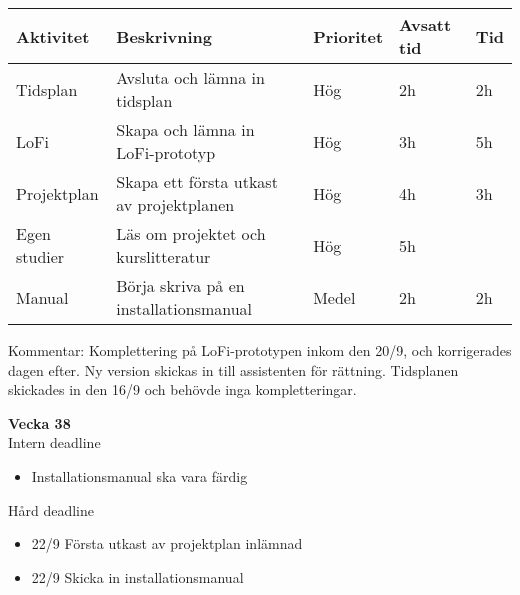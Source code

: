 \documentclass{mall}
\begin{document}
\begin{table}[h]
\begin{tabularx}{\textwidth}{|l|X|l|l|l|}
\hline

Aktivitet    & Beskrivning                              & Prioritet  & Avsatt tid & Tid \\ \hline
Tidsplan     & Avsluta och lämna in tidsplan            & Hög   & 2h         & 2h     \\ \hline
LoFi         & Skapa och lämna in LoFi-prototyp         & Hög   & 3h         & 5h     \\ \hline
Projektplan  & Skapa ett första utkast av projektplanen & Hög   & 4h         & 3h    \\ \hline
Egen studier & Läs om projektet och kurslitteratur      & Hög   & 5h         &     \\ \hline
Manual       & Börja skriva på en installationsmanual   & Medel & 2h         & 2h    \\ \hline

\end{tabularx}
\end{table}

Kommentar: Komplettering på LoFi-prototypen inkom den 20/9, och korrigerades dagen efter. Ny version skickas in till assistenten för rättning.
Tidsplanen skickades in den 16/9 och behövde inga kompletteringar.

\pagebreak

\hphantom{$\bullet$} \textbf{Vecka 38}\\

Intern deadline
\begin{itemize}
\color{blue}
    \item Installationsmanual ska vara färdig
\end{itemize}

Hård deadline

\begin{itemize}
\color{red}
    \item 22/9 Första utkast av projektplan inlämnad

    \item 22/9 Skicka in
installationsmanual
\end{itemize}
\end{document}
